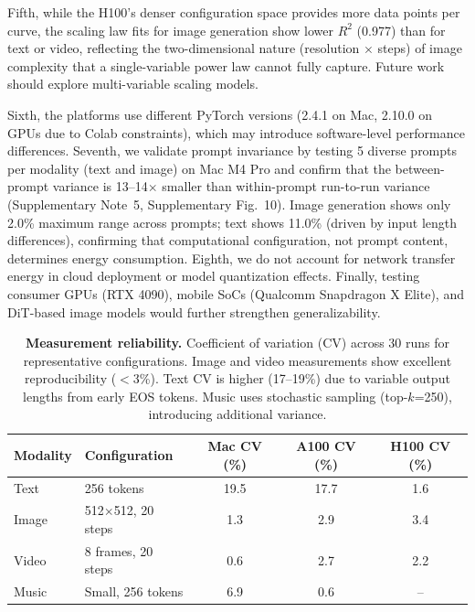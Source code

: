 \documentclass[preprint,12pt]{elsarticle}
\begin{document}
Fifth, while the H100's denser configuration space provides more data points per curve, the scaling law fits for image generation show lower $R^2$ (0.977) than for text or video, reflecting the two-dimensional nature (resolution $\times$ steps) of image complexity that a single-variable power law cannot fully capture. Future work should explore multi-variable scaling models.

Sixth, the platforms use different PyTorch versions (2.4.1 on Mac, 2.10.0 on GPUs due to Colab constraints), which may introduce software-level performance differences. Seventh, we validate prompt invariance by testing 5 diverse prompts per modality (text and image) on Mac M4 Pro and confirm that the between-prompt variance is 13--14$\times$ smaller than within-prompt run-to-run variance (Supplementary Note~5, Supplementary Fig.~10). Image generation shows only 2.0\% maximum range across prompts; text shows 11.0\% (driven by input length differences), confirming that computational configuration, not prompt content, determines energy consumption. Eighth, we do not account for network transfer energy in cloud deployment or model quantization effects. Finally, testing consumer GPUs (RTX 4090), mobile SoCs (Qualcomm Snapdragon X Elite), and DiT-based image models would further strengthen generalizability.

\begin{table}[t]
\centering
\caption{\textbf{Measurement reliability.} Coefficient of variation (CV) across 30 runs for representative configurations. Image and video measurements show excellent reproducibility ($<$3\%). Text CV is higher (17--19\%) due to variable output lengths from early EOS tokens. Music uses stochastic sampling (top-$k$=250), introducing additional variance.}
\label{tab:reliability}
\small
\begin{tabular}{@{}llccc@{}}
\toprule
\textbf{Modality} & \textbf{Configuration} & \textbf{Mac CV (\%)} & \textbf{A100 CV (\%)} & \textbf{H100 CV (\%)} \\
\midrule
Text & 256 tokens & 19.5 & 17.7 & 1.6 \\
Image & 512$\times$512, 20 steps & 1.3 & 2.9 & 3.4 \\
Video & 8 frames, 20 steps & 0.6 & 2.7 & 2.2 \\
Music & Small, 256 tokens & 6.9 & 0.6 & -- \\
\bottomrule
\end{tabular}
\end{table}

\end{document}
